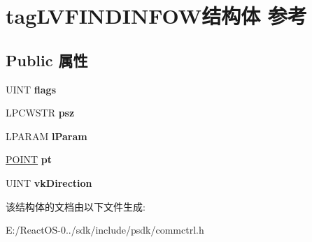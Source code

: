 \hypertarget{structtag_l_v_f_i_n_d_i_n_f_o_w}{}\section{tag\+L\+V\+F\+I\+N\+D\+I\+N\+F\+O\+W结构体 参考}
\label{structtag_l_v_f_i_n_d_i_n_f_o_w}
\subsection*{Public 属性}
\begin{DoxyCompactItemize}
\item 
\mbox{\label{structtag_l_v_f_i_n_d_i_n_f_o_w_adf02123edff05cfc5b716db852ea5b3a}} 
U\+I\+NT {\bfseries flags}
\item 
\mbox{\label{structtag_l_v_f_i_n_d_i_n_f_o_w_ab73caa4990b0903b9a7f93893bae1091}} 
L\+P\+C\+W\+S\+TR {\bfseries psz}
\item 
\mbox{\label{structtag_l_v_f_i_n_d_i_n_f_o_w_ae2d3c330832b1f936c13b027fb6b0b9f}} 
L\+P\+A\+R\+AM {\bfseries l\+Param}
\item 
\mbox{\label{structtag_l_v_f_i_n_d_i_n_f_o_w_a479d71d9797dea68ddc4ff913c41ff2a}} 
\hyperlink{structtag_p_o_i_n_t}{P\+O\+I\+NT} {\bfseries pt}
\item 
\mbox{\label{structtag_l_v_f_i_n_d_i_n_f_o_w_aad49dedc3eb060200a1bf8b51112a6d7}} 
U\+I\+NT {\bfseries vk\+Direction}
\end{DoxyCompactItemize}


该结构体的文档由以下文件生成\+:\begin{DoxyCompactItemize}
\item 
E\+:/\+React\+O\+S-\/0../sdk/include/psdk/commctrl.\+h\end{DoxyCompactItemize}
